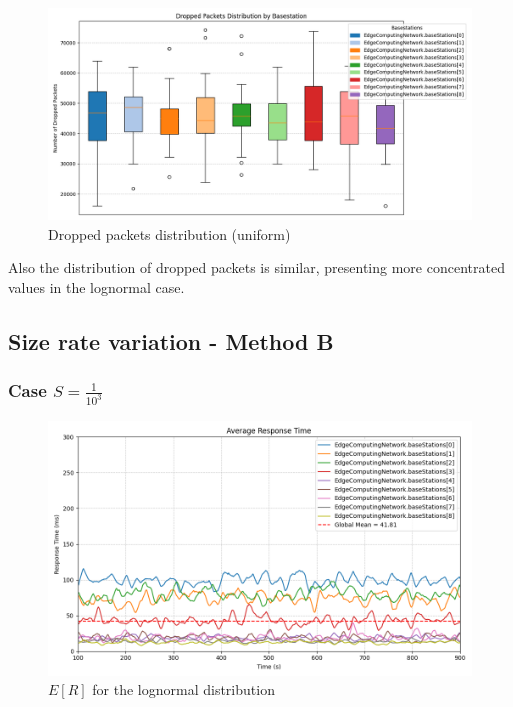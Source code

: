 \documentclass{report}
\begin{document}
\begin{figure}[H]
    \centering
    \includegraphics[width=\textwidth]{img/plots/uni_1e4_A/dropped.png}
    \caption{Dropped packets distribution (uniform)}
\end{figure}

\begin{flushleft}
Also the distribution of dropped packets is similar, presenting more concentrated values in the lognormal case.
\end{flushleft}

\subsection{Size rate variation - Method B}
\subsubsection*{Case $S=\frac{1}{10^3}$}

\begin{figure}[H]
    \centering
    \includegraphics[width=\textwidth]{img/plots/log_1e3_B/resptime.png}
    \caption{$E[R]$ for the lognormal distribution}
\end{figure}
\end{document}
